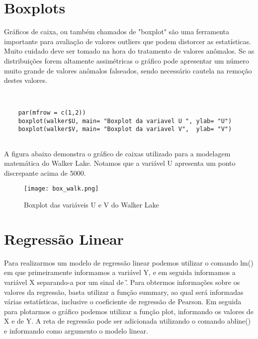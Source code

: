 \section{Boxplots} 

Gráficos de caixa, ou também chamados de "boxplot" são uma ferramenta importante para avaliação de valores outliers que podem distorcer as estatísticas. Muito cuidado deve ser tomado na hora do tratamento de valores anômalos. Se as distribuições forem altamente assimétricas o gráfico pode apresentar um número muito grande de valores anômalos falseados, sendo necessário cautela na remoção destes valores.  

\begin{scriptsize}
	\estiloR
	\begin{lstlisting}[caption={Criação de um vetor em R}, label=lst:rcode]
	
	
	par(mfrow = c(1,2))
	boxplot(walker$U, main= "Boxplot da variavel U ", ylab= "U")
	boxplot(walker$V, main= "Boxplot da variavel V",  ylab= "V")
	
	\end{lstlisting}
\end{scriptsize}

A figura abaixo demonstra o gráfico de caixas utilizado para a modelagem matemática do Walker Lake. Notamos que a variável U apresenta um ponto discrepante acima de 5000.

\FloatBarrier
\begin{figure}[h]
	\centering
	\texttt{[image: box\_walk.png]}	
	\caption{Boxplot das variáveis U e V do Walker Lake}
	\label{walk}
\end{figure}
\FloatBarrier

\section{Regressão Linear}

Para realizarmos um modelo de regressão linear podemos utilizar o comando lm() em que primeiramente informamos a variável Y, e em seguida informamos a variável X separando-a por um sinal de \~. Para obtermos informações sobre os valores da regressão, basta utilizar a função summary, ao qual será informadas várias estatísticas, inclusive o coeficiente de regressão de Pearson. Em seguida para plotarmos o gráfico podemos utilizar a função plot, informando os valores de X e de Y. A reta de regressão pode ser adicionada utilizando o comando abline() e informando como argumento o modelo linear.

